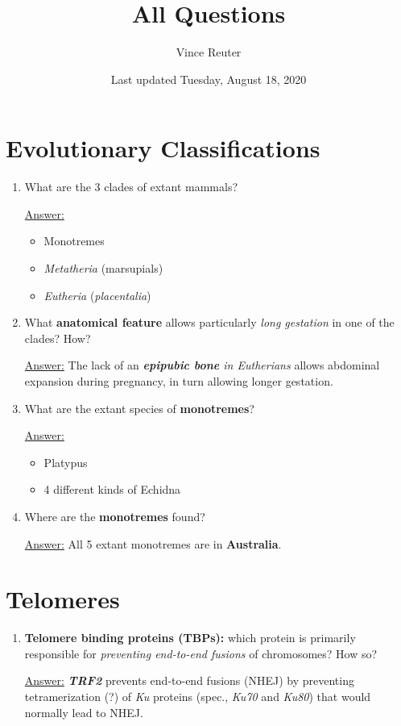 \documentclass{article}
\title{All Questions}
\author{Vince Reuter}
\date{Last updated Tuesday, August 18, 2020}
\newenvironment{QandA}{\begin{enumerate}[label=\bfseries Q\arabic*.]}
                       {\end{enumerate}}
\newenvironment{answered}{\par\normalfont\underline{Answer:}}{}
\begin{document}
\maketitle

\tableofcontents

\section{Evolutionary Classifications}
\begin{QandA}
  \item{What are the 3 clades of extant mammals?}
    \begin{answered}
    \begin{itemize}
      \item{Monotremes}
      \item{\textit{Metatheria} (marsupials)}
      \item{\textit{Eutheria} (\textit{placentalia})}
    \end{itemize}
    \end{answered}
  \item{What \textbf{anatomical feature} allows particularly \textit{long gestation} in one of the clades? How?}
    \begin{answered}
    The lack of an \textit{\textbf{epipubic bone} in Eutherians} allows abdominal expansion during pregnancy, in turn allowing longer gestation.
    \end{answered}
  \item{What are the extant species of \textbf{monotremes}?}
    \begin{answered}
    \begin{itemize}
      \item{Platypus}
      \item{4 different kinds of Echidna}
    \end{itemize}
    \end{answered}
  \item{Where are the \textbf{monotremes} found?}
    \begin{answered}
    All 5 extant monotremes are in \textbf{Australia}.
    \end{answered}
\end{QandA}
\section{Telomeres}
\begin{QandA}
  \item{\textbf{Telomere binding proteins (TBPs):} which protein is primarily responsible for \textit{preventing end-to-end fusions} of chromosomes? How so?}
    \begin{answered}
    \textbf{\textit{TRF2}} prevents end-to-end fusions (NHEJ) by preventing tetramerization (?) of \textit{Ku} proteins (spec., \textit{Ku70} and \textit{Ku80}) that would normally lead to NHEJ.
    \end{answered}
\end{QandA}
\end{document}
